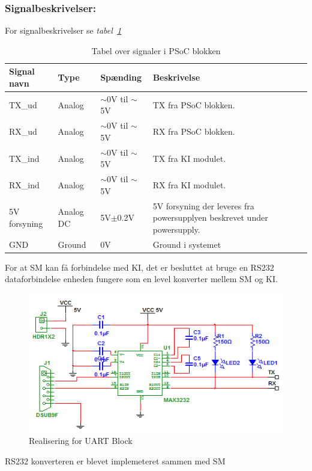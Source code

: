 \subsubsection{Signalbeskrivelser:}
For signalbeskrivelser se \textit{tabel~\ref{table:UARTSignalerSM}}
\begin{table}[H]
\begin{tabular}{|p{3cm}|p{3cm}|p{3cm}|p{4.5cm}|} \hline
\cellcolor[gray]{0.85}Signal navn& \cellcolor[gray]{0.85}Type &\cellcolor[gray]{0.85}Spænding&\cellcolor[gray]{0.85}Beskrivelse\\ \hline
TX\_ud & Analog & $\sim$0V til $\sim$5V & TX fra PSoC blokken.\\ \hline
RX\_ud & Analog & $\sim$0V til $\sim$5V & RX fra PSoC blokken. \\ \hline
TX\_ind & Analog & $\sim$0V til $\sim$5V & TX fra KI modulet.\\ \hline
RX\_ind & Analog & $\sim$0V til $\sim$5V & RX fra KI modulet. \\ \hline
5V forsyning & Analog DC & 5V$\pm$0.2V & 5V forsyning der leveres fra powersupplyen beskrevet under powersupply.\\ \hline
GND & Ground & 0V & Ground i systemet \\ \hline
\end{tabular}
\caption{Tabel over signaler i PSoC blokken}
\label{table:UARTSignalerSM}
\end{table}


For at SM kan få forbindelse med KI,   det er besluttet at bruge en RS232 dataforbindelse enheden fungere som en level konverter mellem SM og KI. 
\begin{figure}[H]
\centering
\includegraphics[scale=1]{billeder/HWUART}
\caption{Realisering for UART Block}
\label{fig:SMHWUARTB}
\end{figure}
RS232 konverteren er blevet implemeteret sammen med SM 
